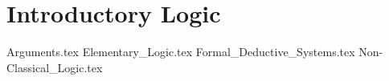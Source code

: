\newcommand{\argument}[2]{\begin{tabular}{p{#1 cm}} #2 \end{tabular}}

\section{Introductory Logic}

{Arguments.tex}
{Elementary_Logic.tex}
{Formal_Deductive_Systems.tex}
{Non-Classical_Logic.tex}